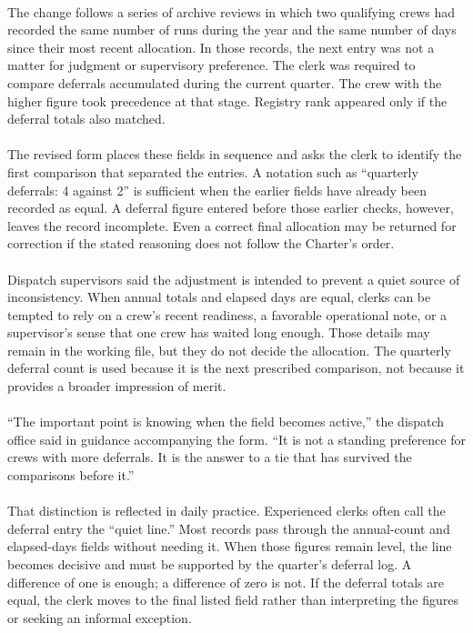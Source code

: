 \documentclass[9pt]{article}
\begin{document}
\begin{minipage}[t]{\textwidth}
\begin{minipage}[t]{0.49\textwidth}
\begin{exbox}
{  \  \\
  The change follows a series of archive reviews in which two qualifying crews had recorded the same number of runs during the year and the same number of days since their most recent allocation. In those records, the next entry was not a matter for judgment or supervisory preference. The clerk was required to compare deferrals accumulated during the current quarter. The crew with the higher figure took precedence at that stage. Registry rank appeared only if the deferral totals also matched. \\
  \  \\
  The revised form places these fields in sequence and asks the clerk to identify the first comparison that separated the entries. A notation such as ``quarterly deferrals: 4 against 2'' is sufficient when the earlier fields have already been recorded as equal. A deferral figure entered before those earlier checks, however, leaves the record incomplete. Even a correct final allocation may be returned for correction if the stated reasoning does not follow the Charter's order. \\
  \  \\
  Dispatch supervisors said the adjustment is intended to prevent a quiet source of inconsistency. When annual totals and elapsed days are equal, clerks can be tempted to rely on a crew's recent readiness, a favorable operational note, or a supervisor's sense that one crew has waited long enough. Those details may remain in the working file, but they do not decide the allocation. The quarterly deferral count is used because it is the next prescribed comparison, not because it provides a broader impression of merit. \\
  \  \\
  ``The important point is knowing when the field becomes active,'' the dispatch office said in guidance accompanying the form. ``It is not a standing preference for crews with more deferrals. It is the answer to a tie that has survived the comparisons before it.'' \\
  \  \\
  That distinction is reflected in daily practice. Experienced clerks often call the deferral entry the ``quiet line.'' Most records pass through the annual-count and elapsed-days fields without needing it. When those figures remain level, the line becomes decisive and must be supported by the quarter's deferral log. A difference of one is enough; a difference of zero is not. If the deferral totals are equal, the clerk moves to the final listed field rather than interpreting the figures or seeking an informal exception. \\
}
\end{exbox}
\end{minipage}
\end{minipage}
\end{document}
